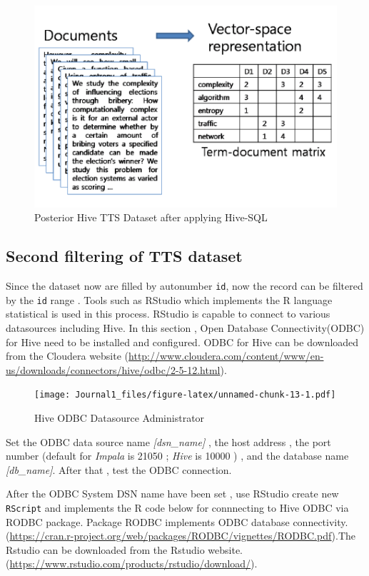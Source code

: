 \documentclass[]{article}
\begin{document}
\begin{figure}[htbp]
\centering
\includegraphics{Journal1_files/figure-latex/unnamed-chunk-11-1.pdf}
\caption{Posterior Hive TTS Dataset after applying Hive-SQL}
\end{figure}

\pagebreak

\subsection{Second filtering of TTS
dataset}\label{second-filtering-of-tts-dataset}

Since the dataset now are filled by autonumber \texttt{id}, now the
record can be filtered by the \texttt{id} range . Tools such as RStudio
which implements the R language statistical is used in this process.
RStudio is capable to connect to various datasources including Hive. In
this section , Open Database Connectivity(ODBC) for Hive need to be
installed and configured. ODBC for Hive can be downloaded from the
Cloudera website
(\url{http://www.cloudera.com/content/www/en-us/downloads/connectors/hive/odbc/2-5-12.html}).

\begin{figure}[htbp]
\centering
\texttt{[image: Journal1\_files/figure-latex/unnamed-chunk-13-1.pdf]}
\caption{Hive ODBC Datasource Administrator}
\end{figure}

Set the ODBC data source name \emph{{[}dsn\_name{]}} , the host address
, the port number (default for \emph{Impala} is 21050 ; \emph{Hive} is
10000 ) , and the database name \emph{{[}db\_name{]}}. After that , test
the ODBC connection.

After the ODBC System DSN name have been set , use RStudio create new
\texttt{RScript} and implements the R code below for connnecting to Hive
ODBC via RODBC package. Package RODBC implements ODBC database
connectivity.
(\url{https://cran.r-project.org/web/packages/RODBC/vignettes/RODBC.pdf}).The
Rstudio can be downloaded from the Rstudio website.
(\url{https://www.rstudio.com/products/rstudio/download/}).
\end{document}
